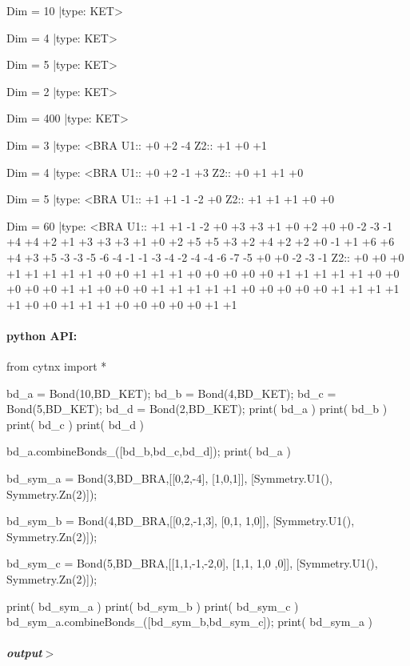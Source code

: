 \begin{DoxyVerbInclude}
Dim = 10 |type: KET>     

Dim = 4 |type: KET>     

Dim = 5 |type: KET>     

Dim = 2 |type: KET>     

Dim = 400 |type: KET>     

Dim = 3 |type: <BRA     
 U1::  +0 +2 -4
 Z2::  +1 +0 +1

Dim = 4 |type: <BRA     
 U1::  +0 +2 -1 +3
 Z2::  +0 +1 +1 +0

Dim = 5 |type: <BRA     
 U1::  +1 +1 -1 -2 +0
 Z2::  +1 +1 +1 +0 +0

Dim = 60 |type: <BRA     
 U1::  +1 +1 -1 -2 +0 +3 +3 +1 +0 +2 +0 +0 -2 -3 -1 +4 +4 +2 +1 +3 +3 +3 +1 +0 +2 +5 +5 +3 +2 +4 +2 +2 +0 -1 +1 +6 +6 +4 +3 +5 -3 -3 -5 -6 -4 -1 -1 -3 -4 -2 -4 -4 -6 -7 -5 +0 +0 -2 -3 -1
 Z2::  +0 +0 +0 +1 +1 +1 +1 +1 +0 +0 +1 +1 +1 +0 +0 +0 +0 +0 +1 +1 +1 +1 +1 +0 +0 +0 +0 +0 +1 +1 +0 +0 +0 +1 +1 +1 +1 +1 +0 +0 +0 +0 +0 +1 +1 +1 +1 +1 +0 +0 +1 +1 +1 +0 +0 +0 +0 +0 +1 +1

\end{DoxyVerbInclude}
 \paragraph*{python A\+PI\+:}


\begin{DoxyCodeInclude}
\textcolor{keyword}{from} cytnx \textcolor{keyword}{import} *

bd\_a = Bond(10,BD\_KET);
bd\_b = Bond(4,BD\_KET);
bd\_c = Bond(5,BD\_KET);
bd\_d = Bond(2,BD\_KET);
print( bd\_a )
print( bd\_b )
print( bd\_c )   
print( bd\_d )

bd\_a.combineBonds\_([bd\_b,bd\_c,bd\_d]);
print( bd\_a )


bd\_sym\_a = Bond(3,BD\_BRA,[[0,2,-4],
                          [1,0,1]],
                          [Symmetry.U1(),
                           Symmetry.Zn(2)]);
                            
bd\_sym\_b = Bond(4,BD\_BRA,[[0,2,-1,3],
                          [0,1, 1,0]],
                          [Symmetry.U1(),
                           Symmetry.Zn(2)]);

bd\_sym\_c = Bond(5,BD\_BRA,[[1,1,-1,-2,0],
                          [1,1, 1,0 ,0]],
                          [Symmetry.U1(),
                           Symmetry.Zn(2)]);

print( bd\_sym\_a )
print( bd\_sym\_b )
print( bd\_sym\_c )
bd\_sym\_a.combineBonds\_([bd\_sym\_b,bd\_sym\_c]);
print( bd\_sym\_a )
\end{DoxyCodeInclude}
 \subparagraph*{output$>$}


